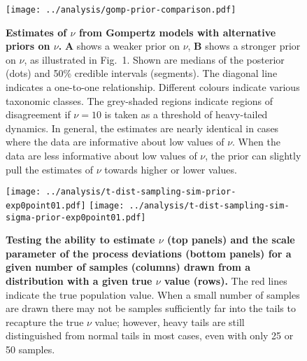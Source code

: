 \documentclass[12pt]{article}
\begin{document}
\clearpage

\begin{figure}[htbp]
\begin{center}
\texttt{[image: ../analysis/gomp-prior-comparison.pdf]}

\caption{\textbf{Estimates of $\nu$ from Gompertz models with alternative priors on $\nu$.} \textbf{A} shows a weaker prior on $\nu$, \textbf{B} shows a stronger prior on $\nu$, as illustrated in Fig.~1. Shown are medians of the posterior (dots) and 50\% credible intervals (segments). The diagonal line indicates a one-to-one relationship. Different colours indicate various taxonomic classes. The grey-shaded regions indicate regions of disagreement if $\nu = 10$ is taken as a threshold of heavy-tailed dynamics. In general, the estimates are nearly identical in cases where the data are informative about low values of $\nu$. When the data are less informative about low values of $\nu$, the prior can slightly pull the estimates of $\nu$ towards higher or lower values.}

\label{fig:alt-priors}
\end{center}
\end{figure}

\clearpage

\begin{figure}[htbp]
\begin{center}
\texttt{[image: ../analysis/t-dist-sampling-sim-prior-exp0point01.pdf]}
\texttt{[image: ../analysis/t-dist-sampling-sim-sigma-prior-exp0point01.pdf]}

\caption{\textbf{Testing the ability to estimate $\nu$ (top panels) and the scale parameter of the process deviations (bottom panels) for a given number of samples (columns) drawn from a distribution with a given true $\nu$ value (rows).} The red lines indicate the true population value. When a small number of samples are drawn there may not be samples sufficiently far into the tails to recapture the true $\nu$ value; however, heavy tails are still distinguished from normal tails in most cases, even with only 25 or 50 samples.}

\label{fig:sim-nu}
\end{center}
\end{figure}

\clearpage
\end{document}

